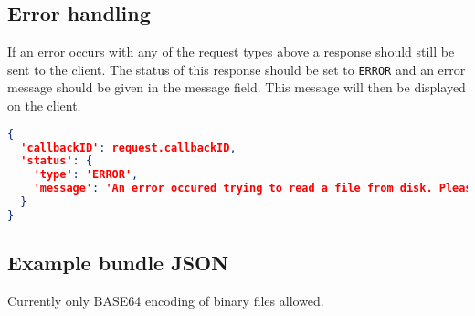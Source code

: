 \documentclass[A4,12pt, utf8]{article}
\begin{document}
\subsection{Error handling}

If an error occurs with any of the request types above a response should still be sent to the client. The status of this response should be set to \texttt{ERROR} and an error message should be given in the message field. This message will then be displayed on the client.

\begin{lstlisting}[caption=ERROR reply content, language=json]
{
  'callbackID': request.callbackID,
  'status': {
    'type': 'ERROR',
    'message': 'An error occured trying to read a file from disk. Please make sure: /path/to/file exists or check the config...
  }
}
\end{lstlisting}

\subsection{Example bundle JSON}



Currently only BASE64 encoding of binary files allowed.
\end{document}
